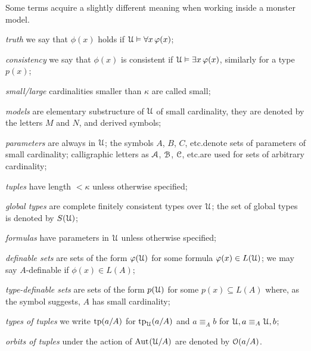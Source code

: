 \documentclass[creche.tex]{subfiles}
\begin{document}
Some terms acquire a slightly different meaning when working inside a monster model.


\newcommand{\labellalunga}[1]{#1\hfill}
\newenvironment{litemize}[1]
   {\begin{list}{}{
   \setlength{\parskip}{0mm}
   \setlength{\topsep}{5mm}
   \setlength{\partopsep}{0mm}
   \setlength{\rightmargin}{0mm}
   \setlength{\listparindent}{0mm}
   \setlength{\itemindent}{0mm}
   \setlength{\itemsep}{3mm}
   \settowidth{\labelwidth}{#1}
   \setlength{\parsep}{0mm}
   \setlength{\partopsep}{0mm}
   \setlength{\labelsep}{3mm}
   \setlength{\leftmargin}{\labelwidth+\labelsep}
   \let\makelabel\labellalunga}}{
   \end{list}}


\begin{litemize}{{\bf type-definable sets}}
\item[\emph{truth}] we say that $\phi(x)$ holds if $\EuScript U\vDash\forall x\,\varphi(x)$;
\item[\emph{consistency}] we say that $\phi(x)$ is consistent if $\EuScript U\vDash\exists x\,\varphi(x)$, similarly for a type $p(x)$;
\item[\emph{small/large}] cardinalities smaller than $\kappa$ are called small; 
\item[\emph{models}] are elementary substructure of $\EuScript U$ of small cardinality, they are denoted by the letters $M$ and $N$, and derived symbols;
\item[\emph{parameters}] are always in $\EuScript U$; the symbols $A$, $B$, $C$, etc.\@ denote sets of parameters of small cardinality; calligraphic letters as $\EuScript A$, $\EuScript B$, $\EuScript C$, etc.\@ are used for sets of arbitrary cardinality;
\item[\emph{tuples}]  have length $<\kappa$ unless otherwise specified;
\item[\emph{global types}] are complete finitely consistent types over $\EuScript U$; the set of global types is denoted by $S(\EuScript U)$;
\item[\emph{formulas}] have parameters in $\EuScript U$ unless otherwise specified;
\item[\emph{definable sets}] are sets of the form $\varphi(\EuScript U)$ for some formula $\varphi(x)\in L(\EuScript U)$; we may say $A$-definable if $\phi(x)\in L(A)$;
\item[\emph{type-definable sets}] are sets of the form $p(\EuScript U)$ for some $p(x)\subseteq L(A)$ where, as the symbol suggests, $A$ has small cardinality;
\item[\emph{types of tuples}] we write ${\rm tp}(a/A)$ for ${\rm tp}_\EuScript U(a/A)$ and $a\equiv_A b$ for $\EuScript U,a \equiv_A \EuScript U,b$; 
\item[\emph{orbits of tuples}] under the action of $\textrm{Aut\kern.15ex}(\EuScript U/A)$ are denoted by $\EuScript O(a/A)$.
\end{litemize}
\end{document}
